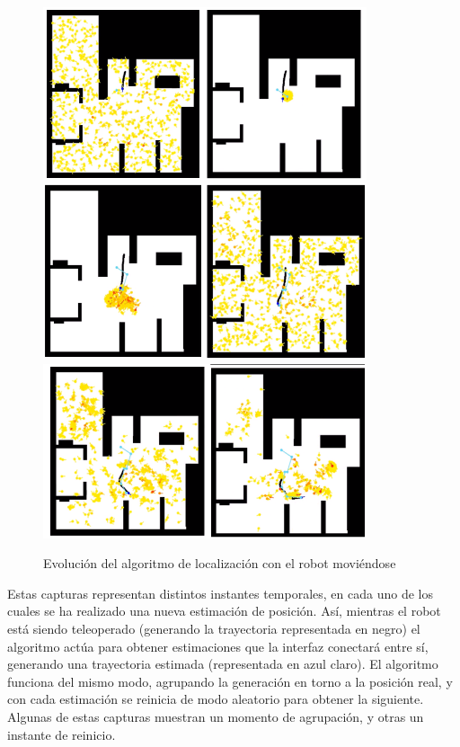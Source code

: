 \begin{figure}[H]
	\begin{center}
		\includegraphics[width=0.850\textwidth]{figures/lloutputmov1.png}
		\includegraphics[width=0.850\textwidth]{figures/lloutputmov2.png}
		\includegraphics[width=0.850\textwidth]{figures/lloutputmov3.png}
		\caption{Evolución del algoritmo de localización con el robot moviéndose}
		\label{fig.outputllmov}
		\end{center}
\end{figure}

Estas capturas representan distintos instantes temporales, en cada uno de los cuales se ha realizado una nueva estimación de posición. Así, mientras el robot está siendo teleoperado (generando la trayectoria representada en negro) el algoritmo actúa para obtener estimaciones que la interfaz conectará entre sí, generando una trayectoria estimada (representada en azul claro). El algoritmo funciona del mismo modo, agrupando la generación en torno a la posición real, y con cada estimación se reinicia de modo aleatorio para obtener la siguiente. Algunas de estas capturas muestran un momento de agrupación, y otras un instante de reinicio.

